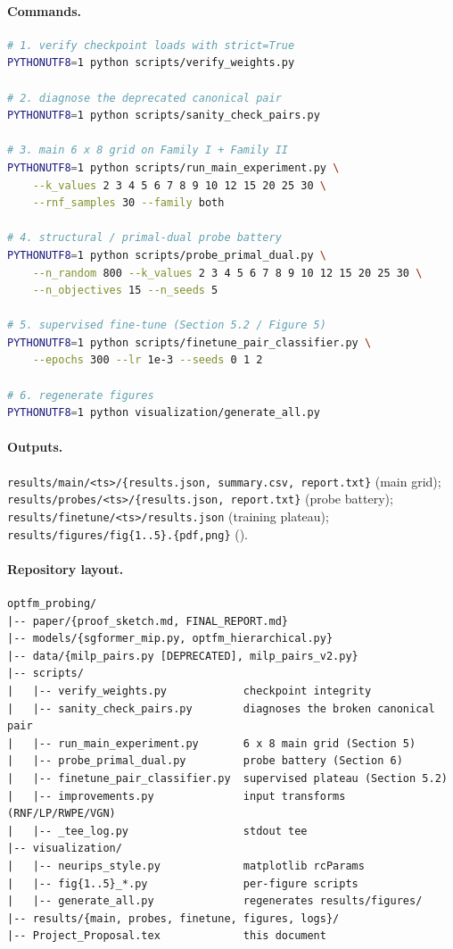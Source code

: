 \documentclass[11pt]{article}
\theoremstyle{plain}
\theoremstyle{definition}
\theoremstyle{remark}
\begin{document}
\paragraph{Commands.}
\begin{lstlisting}[language=bash]
# 1. verify checkpoint loads with strict=True
PYTHONUTF8=1 python scripts/verify_weights.py

# 2. diagnose the deprecated canonical pair
PYTHONUTF8=1 python scripts/sanity_check_pairs.py

# 3. main 6 x 8 grid on Family I + Family II
PYTHONUTF8=1 python scripts/run_main_experiment.py \
    --k_values 2 3 4 5 6 7 8 9 10 12 15 20 25 30 \
    --rnf_samples 30 --family both

# 4. structural / primal-dual probe battery
PYTHONUTF8=1 python scripts/probe_primal_dual.py \
    --n_random 800 --k_values 2 3 4 5 6 7 8 9 10 12 15 20 25 30 \
    --n_objectives 15 --n_seeds 5

# 5. supervised fine-tune (Section 5.2 / Figure 5)
PYTHONUTF8=1 python scripts/finetune_pair_classifier.py \
    --epochs 300 --lr 1e-3 --seeds 0 1 2

# 6. regenerate figures
PYTHONUTF8=1 python visualization/generate_all.py
\end{lstlisting}

\paragraph{Outputs.}
\texttt{results/main/<ts>/\{results.json, summary.csv, report.txt\}}
(main grid);
\texttt{results/probes/<ts>/\{results.json, report.txt\}} (probe battery);
\texttt{results/finetune/<ts>/results.json} (training plateau);
\texttt{results/figures/fig\{1..5\}.\{pdf,png\}} ().

\paragraph{Repository layout.}
\begin{lstlisting}[basicstyle=\ttfamily\scriptsize]
optfm_probing/
|-- paper/{proof_sketch.md, FINAL_REPORT.md}
|-- models/{sgformer_mip.py, optfm_hierarchical.py}
|-- data/{milp_pairs.py [DEPRECATED], milp_pairs_v2.py}
|-- scripts/
|   |-- verify_weights.py            checkpoint integrity
|   |-- sanity_check_pairs.py        diagnoses the broken canonical pair
|   |-- run_main_experiment.py       6 x 8 main grid (Section 5)
|   |-- probe_primal_dual.py         probe battery (Section 6)
|   |-- finetune_pair_classifier.py  supervised plateau (Section 5.2)
|   |-- improvements.py              input transforms (RNF/LP/RWPE/VGN)
|   |-- _tee_log.py                  stdout tee
|-- visualization/
|   |-- neurips_style.py             matplotlib rcParams
|   |-- fig{1..5}_*.py               per-figure scripts
|   |-- generate_all.py              regenerates results/figures/
|-- results/{main, probes, finetune, figures, logs}/
|-- Project_Proposal.tex             this document
\end{lstlisting}
\end{document}
